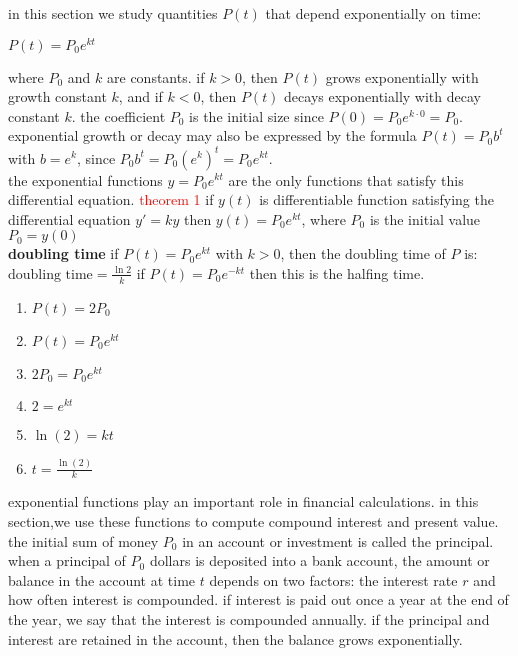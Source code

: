 \documentclass{article}
\begin{document}
in this section we study quantities $P(t)$ that depend exponentially on time:

\begin{center}$P(t) = P_0e^{kt}$\end{center}

where $P_0$ and $k$ are constants. if $k > 0$, then $P(t)$ grows exponentially with growth constant $k$, and if $k < 0$, then $P(t)$ decays exponentially with decay constant $k$. the coefficient $P_0$ is the initial size since $P(0) = P_0e^{k \cdot 0} = P_0$. exponential growth or decay may also be expressed by the formula $P(t) = P_0b^t$ with $b = e^k$, since $P_0b^t = P_0(e^k)^t = P_0e^{kt}$.\\

the exponential functions $y = P_0e^{kt}$ are the only functions that satisfy this differential equation. \textcolor{red}{theorem 1} if $y(t)$ is differentiable function satisfying the differential equation $y' = ky$ then $y(t) = P_0e^{kt}$, where $P_0$ is the initial value $P_0 = y(0)$\\

\textbf{doubling time} if $P(t) = P_0e^{kt}$ with $k > 0$, then the doubling time of $P$ is:\\
$\text{doubling time} = \frac{\ln2}{k}$ if $P(t) = P_0e^{-kt}$ then this is the halfing time.\\

	\begin{enumerate}
		\item $P(t) = 2P_0$
		\item $P(t) = P_0e^{kt}$
		\item $2P_0 = P_0e^{kt}$
		\item $2 = e^{kt}$
		\item $\ln(2) = kt$
		\item $t = \frac{\ln(2)}{k}$
	\end{enumerate}

exponential functions play an important role in financial calculations. in this section,we use these functions to compute compound interest and present value. the initial sum of money $P_0$ in an account or investment is called the principal. when a principal of $P_0$ dollars is deposited into a bank account, the amount or balance in the account at time $t$ depends on two factors: the interest rate $r$ and how often interest is compounded. if interest is paid out once a year at the end of the year, we say that the interest is compounded annually. if the principal and interest are retained in the account, then the balance grows exponentially.\\
\end{document}
